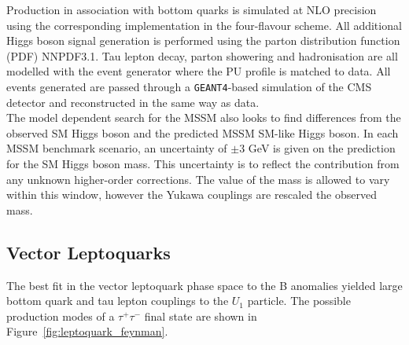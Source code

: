 Production in association with bottom quarks is simulated at NLO precision using the corresponding  implementation in the four-flavour scheme.
All additional Higgs boson signal generation is performed using the parton distribution function (PDF) NNPDF3.1.
Tau lepton decay, parton showering and hadronisation are all modelled with the \PYTHIA event generator where the PU profile is matched to data.
All events generated are passed through a \texttt{GEANT4}-based simulation of the CMS detector and reconstructed in the same way as data. \\

The model dependent search for the MSSM also looks to find differences from the observed SM Higgs boson and the predicted MSSM SM-like Higgs boson.
In each MSSM benchmark scenario, an uncertainty of $\pm 3$ GeV is given on the prediction for the SM Higgs boson mass.
This uncertainty is to reflect the contribution from any unknown higher-order corrections.
The value of the mass is allowed to vary within this window, however the Yukawa couplings are rescaled the observed mass.

\subsection{Vector Leptoquarks}
\label{sec:vlq}

The best fit in the vector leptoquark phase space to the B anomalies yielded large bottom quark and tau lepton couplings to the $U_1$ particle.
The possible production modes of a $\tau^+\tau^-$ final state are shown in Figure~\ref{fig:leptoquark_feynman}.


